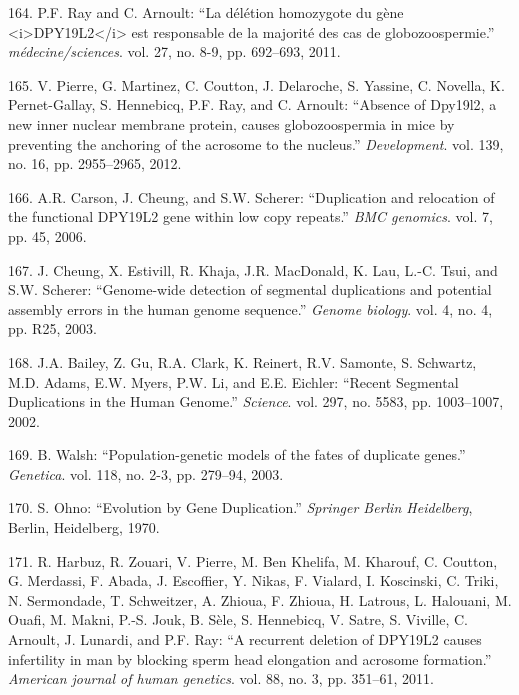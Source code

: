 \documentclass[12pt,twoside]{ugathesis}
\theoremstyle{definition}
\theoremstyle{definition}
\theoremstyle{remark}
\begin{document}
\hypertarget{ref-Ray2011}{}
164. P.F. Ray and C. Arnoult: ``La délétion homozygote du gène
\textless{}i\textgreater{}DPY19L2\textless{}/i\textgreater{} est
responsable de la majorité des cas de globozoospermie.''
\emph{médecine/sciences}. vol. 27, no. 8-9, pp. 692--693, 2011.

\hypertarget{ref-Pierre2012}{}
165. V. Pierre, G. Martinez, C. Coutton, J. Delaroche, S. Yassine, C.
Novella, K. Pernet-Gallay, S. Hennebicq, P.F. Ray, and C. Arnoult:
``Absence of Dpy19l2, a new inner nuclear membrane protein, causes
globozoospermia in mice by preventing the anchoring of the acrosome to
the nucleus.'' \emph{Development}. vol. 139, no. 16, pp. 2955--2965,
2012.

\hypertarget{ref-Carson2006}{}
166. A.R. Carson, J. Cheung, and S.W. Scherer: ``Duplication and
relocation of the functional DPY19L2 gene within low copy repeats.''
\emph{BMC genomics}. vol. 7, pp. 45, 2006.

\hypertarget{ref-Cheung2003}{}
167. J. Cheung, X. Estivill, R. Khaja, J.R. MacDonald, K. Lau, L.-C.
Tsui, and S.W. Scherer: ``Genome-wide detection of segmental
duplications and potential assembly errors in the human genome
sequence.'' \emph{Genome biology}. vol. 4, no. 4, pp. R25, 2003.

\hypertarget{ref-Bailey2002}{}
168. J.A. Bailey, Z. Gu, R.A. Clark, K. Reinert, R.V. Samonte, S.
Schwartz, M.D. Adams, E.W. Myers, P.W. Li, and E.E. Eichler: ``Recent
Segmental Duplications in the Human Genome.'' \emph{Science}. vol. 297,
no. 5583, pp. 1003--1007, 2002.

\hypertarget{ref-Walsh2003}{}
169. B. Walsh: ``Population-genetic models of the fates of duplicate
genes.'' \emph{Genetica}. vol. 118, no. 2-3, pp. 279--94, 2003.

\hypertarget{ref-Ohno1970}{}
170. S. Ohno: ``Evolution by Gene Duplication.'' \emph{Springer Berlin
Heidelberg}, Berlin, Heidelberg, 1970.

\hypertarget{ref-Harbuz2011a}{}
171. R. Harbuz, R. Zouari, V. Pierre, M. Ben Khelifa, M. Kharouf, C.
Coutton, G. Merdassi, F. Abada, J. Escoffier, Y. Nikas, F. Vialard, I.
Koscinski, C. Triki, N. Sermondade, T. Schweitzer, A. Zhioua, F. Zhioua,
H. Latrous, L. Halouani, M. Ouafi, M. Makni, P.-S. Jouk, B. Sèle, S.
Hennebicq, V. Satre, S. Viville, C. Arnoult, J. Lunardi, and P.F. Ray:
``A recurrent deletion of DPY19L2 causes infertility in man by blocking
sperm head elongation and acrosome formation.'' \emph{American journal
of human genetics}. vol. 88, no. 3, pp. 351--61, 2011.
\end{document}
